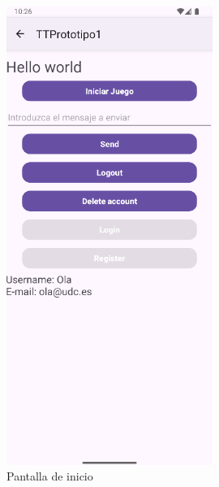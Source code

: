 \documentclass[a4paper,openright,12pt]{article}
\begin{document}
\begin{figure}[htp]
    \centering
    \begin{minipage}{0.3\textwidth}
        \centering
        \includegraphics[width=0.6\textwidth]{Images/Vista_It2.png} 
        \caption{Pantalla de inicio}
        \label{fig:Pantalla de inicio}
    \end{minipage}
    \hfill
    \begin{minipage}{0.3\textwidth}
        \centering

\end{minipage}
\end{figure}
\end{document}
